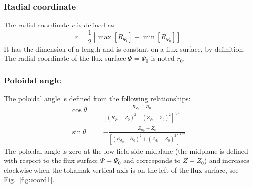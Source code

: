 \documentclass[a4paper]{report}
\begin{document}
\subsubsection{Radial coordinate}
The radial coordinate $r$ is defined as 
\begin{equation}
 r = \frac{1}{2}\left[\max[R_{\Psi_0}] - \min[R_{\Psi_0}]\right]
\end{equation}
It has the dimension of a length and is constant on a flux surface, by definition. The radial coordinate of the flux surface $\Psi=\Psi_0$ is noted $r_0$.

\subsubsection{Poloidal angle}
The poloidal angle is defined from the following relationships:
\begin{eqnarray}
 \cos \theta &=& \frac{R_{\Psi_0}-R_0}{\left[ (R_{\Psi_0}-R_0)^2 + (Z_{\Psi_0}-Z_0)^2 \right]^{1/2}}\\
 \sin \theta &=& -\frac{Z_{\Psi_0}-Z_0}{\left[ (R_{\Psi_0}-R_0)^2 + (Z_{\Psi_0}-Z_0)^2 \right]^{1/2}}
\end{eqnarray}
The poloidal angle is zero at the low field side midplane (the midplane is defined with respect to the flux surface $\Psi=\Psi_0$ and corresponds to $Z=Z_0$) and increases clockwise when the tokamak vertical axis is on the left of the flux surface, see Fig.~\ref{fig:coord1}.
\end{document}
